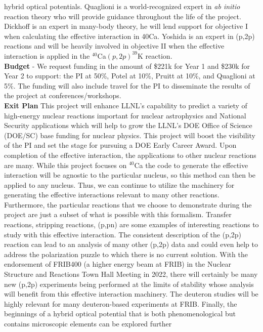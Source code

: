 \documentclass[12pt]{article}
\begin{document}
hybrid optical potentials. Quaglioni is a world-recognized expert in \textit{ab initio} reaction theory who will provide guidance throughout the life of the project. Dickhoff is an
expert in many-body theory, he will lend support for objective I when calculating the effective interaction in 40Ca. Yoshida is an expert in (p,2p) reactions and will be heavily
involved in objective II when the effective interaction is applied in the $^{40}$Ca$(p,2p)^{39}$K reaction.
\\
\textbf{Budget}
 - We request funding in the amount of \$221k for Year 1 and \$230k for Year 2 to support: the PI at 50\%, Potel at 10\%, Pruitt at 10\%, and Quaglioni at 5\%. The funding will
 also include travel for the PI to disseminate the results of the project at conferences/workshops.
\\
\textbf{Exit Plan}
This project will enhance LLNL's capability to predict a variety of high-energy nuclear reactions important for nuclear astrophysics and National Security applications which will
help to grow the LLNL's DOE Office of Science (DOE/SC) base funding for nuclear physics. This project will boost the visibility of the PI and set the stage for pursuing a DOE Early
Career Award. Upon completion of the effective interaction, the applications to other nuclear reactions are many. While this project focuses on $^{40}$Ca the code to generate the
effective interaction will be agnostic to the particular nucleus, so this method can then be applied to any nucleus. Thus, we can continue to utilize the machinery for generating
the effective interactions relevant to many other reactions. Furthermore, the particular reactions that we choose to demonstrate during the project are just a subset of what is
possible with this formalism. Transfer reactions, stripping reactions, (p,pn) are some examples of interesting reactions to study with this effective interaction. The consistent
description of the (p,2p) reaction can lead to an analysis of many other (p,2p) data and could even help to address the polarization puzzle to which there is no current solution.
With the endorsement of FRIB400 (a higher energy beam at FRIB) in the Nuclear Structure and Reactions Town Hall Meeting in 2022, there will certainly be many new (p,2p) experiments
being performed at the limits of stability whose analysis will benefit from this effective interaction machinery. The deuteron studies will be highly relevant for many
deuteron-based experiments at FRIB. Finally, the beginnings of a hybrid optical potential that is both phenomenological but contains microscopic elements can be explored further
\end{document}
